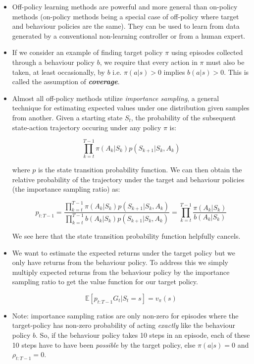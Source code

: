 \begin{itemize}
\item Off-policy learning methods are powerful and more general than on-policy methods (on-policy methods being a special case of off-policy where target and behaviour policies are the same). They can be used to learn from data generated by a conventional non-learning controller or from a human expert.
\item If we consider an example of finding target policy $\pi$ using episodes collected through a behaviour policy $b$, we require that every action in $\pi$ must also be taken, at least occasionally, by $b$ i.e. $\pi(a|s) > 0$ implies $b(a|s) > 0$. This is called the assumption of \textit{\textbf{coverage}}. 
\item Almost all off-policy methods utilize \textit{importance sampling}, a general technique for estimating expected values under one distribution given samples from another. Given a starting state $S_t$, the probability of the subsequent state-action trajectory occuring under any policy $\pi$ is:

\begin{equation}
	\prod_{k=t}^{T-1} \pi(A_k|S_k)p(S_{k+1}|S_k, A_k)
\end{equation}

where $p$ is the state transition probability function. We can then obtain the relative probability of the trajectory under the target and behaviour policies (the importance sampling ratio) as:

\begin{equation}
p_{t:T-1} = \frac{\prod_{k=t}^{T-1} \pi(A_k|S_k)p(S_{k+1}|S_k, A_k)}{\prod_{k=t}^{T-1} b(A_k|S_k)p(S_{k+1}|S_k, A_k)} = \prod_{k=t}^{T-1} \frac{\pi(A_k|S_k)}{b(A_k|S_k)}
\end{equation}

We see here that the state transition probability function helpfully cancels.

\item We want to estimate the expected returns under the target policy but we only have returns from the behaviour policy. To address this we simply multiply expected returns from the behaviour policy by the importance sampling ratio to get the value function for our target policy.

\begin{equation}
\mathbb{E} \left[p_{t:T-1} G_t | S_t = s\right] = v_\pi(s)
\end{equation}

\item Note: importance sampling ratios are only non-zero for episodes where the target-policy has non-zero probability of acting \textit{exactly} like the behaviour policy $b$. So, if the behaviour policy takes 10 steps in an episode, each of these 10 steps have to have been \textit{possible} by the target policy, else $\pi(a|s) = 0$ and $\rho_{t:T-1} = 0$.

\end{itemize}

